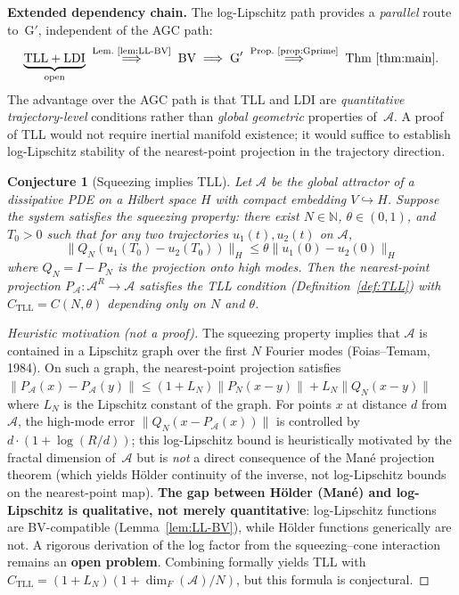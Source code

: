 \documentclass[12pt,a4paper]{article}
\theoremstyle{definition}
\theoremstyle{plain}
\newtheorem{conjecture}[definition]{Conjecture}
\theoremstyle{remark}
\begin{document}
\medskip\noindent
\textbf{Extended dependency chain.}\;
The log-Lipschitz path provides a \emph{parallel} route to~G$'$,
independent of the AGC path:
\[
  \underbrace{\textup{TLL} + \textup{LDI}}_{\text{open}}
  \;\overset{\text{Lem.~\ref{lem:LL-BV}}}{\Longrightarrow}\;
  \textup{BV}
  \;\Longrightarrow\;
  \textup{G}'
  \;\overset{\text{Prop.~\ref{prop:Gprime}}}{\Longrightarrow}\;
  \textup{Thm~\ref{thm:main}}.
\]
The advantage over the AGC path is that TLL and LDI are
\emph{quantitative trajectory-level} conditions rather than
\emph{global geometric} properties of~$\mathcal{A}$.
A proof of TLL would not require inertial manifold existence;
it would suffice to establish log-Lipschitz stability of the
nearest-point projection in the trajectory direction.

\begin{conjecture}[Squeezing implies TLL]\label{conj:squeezing-tll}
Let $\mathcal{A}$ be the global attractor of a dissipative PDE on a Hilbert space $H$ with compact embedding $V \hookrightarrow H$. Suppose the system satisfies the \emph{squeezing property}: there exist $N \in \mathbb{N}$, $\theta \in (0,1)$, and $T_0 > 0$ such that for any two trajectories $u_1(t), u_2(t)$ on $\mathcal{A}$,
\begin{equation}\label{eq:squeezing}
  \|Q_N(u_1(T_0) - u_2(T_0))\|_H \leq \theta \|u_1(0) - u_2(0)\|_H
\end{equation}
where $Q_N = I - P_N$ is the projection onto high modes. Then the nearest-point projection $P_\mathcal{A}: \mathcal{A}^R \to \mathcal{A}$ satisfies the TLL condition (Definition~\ref{def:TLL}) with $C_{\mathrm{TLL}} = C(N, \theta)$ depending only on $N$ and $\theta$.
\end{conjecture}

\begin{proof}[Heuristic motivation (not a proof)]
The squeezing property implies that $\mathcal{A}$ is contained in a Lipschitz graph over the first $N$ Fourier modes (Foias--Temam, 1984). On such a graph, the nearest-point projection satisfies
$\|P_\mathcal{A}(x) - P_\mathcal{A}(y)\| \leq (1 + L_N) \|P_N(x - y)\| + L_N \|Q_N(x - y)\|$
where $L_N$ is the Lipschitz constant of the graph. For points $x$ at distance $d$ from $\mathcal{A}$, the high-mode error $\|Q_N(x - P_\mathcal{A}(x))\|$ is controlled by $d \cdot (1 + \log(R/d))$; this log-Lipschitz bound is heuristically motivated by the fractal dimension of~$\mathcal{A}$ but is \emph{not} a direct consequence of the Man\'e projection theorem (which yields H\"older continuity of the inverse, not log-Lipschitz bounds on the nearest-point map).  \textbf{The gap between H\"older (Man\'e) and log-Lipschitz is qualitative, not merely quantitative}: log-Lipschitz functions are BV-compatible (Lemma~\ref{lem:LL-BV}), while H\"older functions generically are not.  A rigorous derivation of the log factor from the squeezing--cone interaction remains an \textbf{open problem}. Combining formally yields TLL with $C_{\mathrm{TLL}} = (1 + L_N)(1 + \dim_F(\mathcal{A})/N)$, but this formula is conjectural.
\end{proof}
\end{document}
